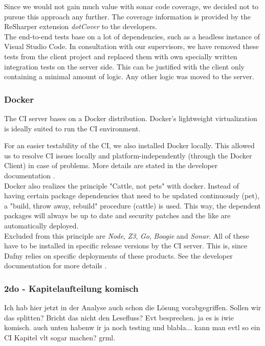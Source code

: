 Since we would not gain much value with sonar code coverage, we decided not to pursue this approach any further.
The coverage information is provided by the ReSharper extension \textit{dotCover} \cite{dotcover} to the developers.\\

The end-to-end tests base on a lot of dependencies, such as a headless instance of Visual Studio Code.
In consultation with our supervisors, we have removed these tests from the client project and replaced them with own specially written integration tests on the server side.
This can be justified with the client only containing a minimal amount of logic.
Any other logic was moved to the server.

\subsubsection{Docker}
The CI server bases on a Docker distribution.
Docker's lightweight virtualization is ideally suited to run the CI environment.

For an easier testability of the CI, we also installed Docker locally.
This allowed us to resolve CI issues locally and platform-independently (through the Docker Client) in case of problems.
More details are stated in the developer documentation \cite{dev}.\\

Docker also realizes the principle "Cattle, not pets" with docker.  
Instead of having certain package dependencies that need to be updated continuously (pet), a "build, throw away, rebuild" procedure (cattle) is used.
This way, the dependent packages will always be up to date and security patches and the like are automatically deployed.\\

Excluded from this principle are \textit{Node}, \textit{Z3}, \textit{Go}, \textit{Boogie} and \textit{Sonar}.
All of these have to be installed in specific release versions by the CI server.
This is, since Dafny relies on specific deployments of these products.
See the developer documentation for more details \cite{dev}.\\

\subsubsection{2do - Kapitelaufteilung komisch}
Ich hab hier jetzt in der Analyse auch schon die Lösung vorabgegriffen. Sollen wir das splitten? Bricht das nicht den Lesefluss? Evt besprechen.
ja es is iwie komisch. auch unten habenw ir ja noch testing und blabla... kann man evtl so ein CI Kapitel vlt sogar machen? grml.

